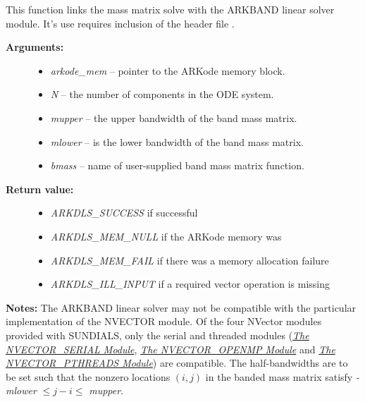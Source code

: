 \documentclass[letterpaper,10pt,english]{sphinxmanual}
\begin{document}
\begin{fulllineitems}
\label{c_interface/User_callable:ARKMassBand}
This function links the mass matrix solve with the ARKBAND linear
solver module.  It's use requires inclusion of the header file
.
\begin{description}
\item[{\textbf{Arguments:}}] \leavevmode\begin{itemize}
\item {} 
\emph{arkode\_mem} -- pointer to the ARKode memory block.

\item {} 
\emph{N} -- the number of components in the ODE system.

\item {} 
\emph{mupper} -- the upper bandwidth of the band mass matrix.

\item {} 
\emph{mlower} -- is the lower bandwidth of the band mass matrix.

\item {} 
\emph{bmass} -- name of user-supplied band mass matrix function.

\end{itemize}

\item[{\textbf{Return value:}}] \leavevmode\begin{itemize}
\item {} 
\emph{ARKDLS\_SUCCESS}   if successful

\item {} 
\emph{ARKDLS\_MEM\_NULL}  if the ARKode memory was 

\item {} 
\emph{ARKDLS\_MEM\_FAIL}  if there was a memory allocation failure

\item {} 
\emph{ARKDLS\_ILL\_INPUT} if a required vector operation is missing

\end{itemize}

\end{description}

\textbf{Notes:} The ARKBAND linear solver may not be compatible with the
particular implementation of the NVECTOR module. Of the four NVector
modules provided with SUNDIALS, only the serial and threaded
modules ({\hyperref[nvectors/NVector_Serial:nvectors-nvserial]{\emph{The NVECTOR\_SERIAL Module}}}, {\hyperref[nvectors/NVector_OpenMP:nvectors-openmp]{\emph{The NVECTOR\_OPENMP Module}}} and
{\hyperref[nvectors/NVector_Pthreads:nvectors-pthreads]{\emph{The NVECTOR\_PTHREADS Module}}}) are compatible.  The half-bandwidths are
to be set such that the nonzero locations $(i, j)$ in the
banded mass matrix satisfy \emph{-mlower} $\le j-i \le$ \emph{mupper}.


\end{fulllineitems}
\end{document}
